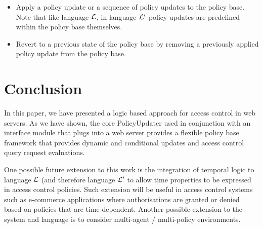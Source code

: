 \documentclass[11pt]{llncs}
\begin{document}
        \begin{itemize}
          \item
            Apply a policy update or a sequence of policy updates to the policy
            base. Note that like language ${\cal L}$, in language ${\cal L'}$
            policy updates are predefined within the policy base themselves.
          \vspace{1mm}
          \item
            Revert to a previous state of the policy base by removing a
            previously applied policy update from the policy base.
        \end{itemize}

  \section{Conclusion}
     \label{conclusion}

    In this paper, we have presented a logic based approach for access control
    in web servers. As we have shown, the core PolicyUpdater used in conjunction
    with an interface module that plugs into a web server provides a flexible
    policy base framework that provides dynamic and conditional updates and
    access control query request evaluations.

    One possible future extension to this work is the integration of temporal
    logic to language ${\cal L}$ (and therefore language ${\cal L'}$ to allow
    time properties to be expressed in access control policies. Such extension
    will be useful in access control systems such as e-commerce applications
    where authorisations are granted or denied based on policies that are time
    dependent. Another possible extension to the system and language is to
    consider multi-agent / multi-policy environments.
\end{document}
